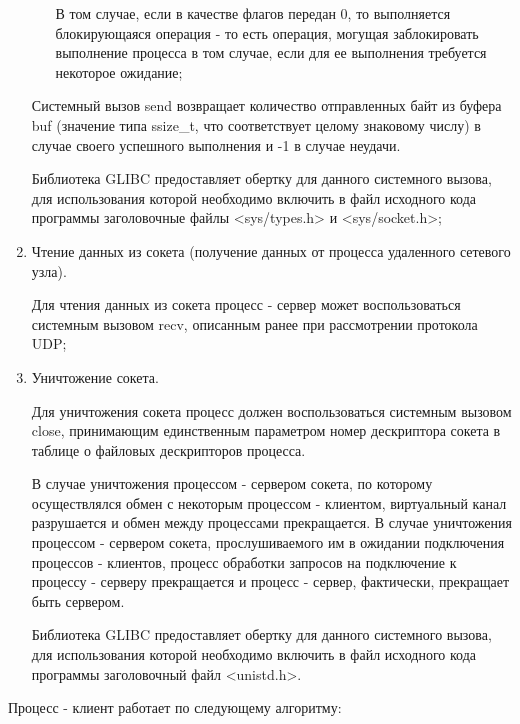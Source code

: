 \begin{enumerate}
\begin{enumerate}
					В том случае, если в качестве флагов передан 0, то выполняется блокирующаяся операция -
					то есть операция, могущая заблокировать выполнение процесса в том случае, если для ее выполнения требуется некоторое ожидание;
					
			\end{enumerate}

			Системный вызов send возвращает количество отправленных байт из буфера buf (значение типа ssize\_t, что соответствует целому знаковому числу)
			в случае своего успешного выполнения и -1 в случае неудачи.

			Библиотека GLIBC предоставляет обертку для данного системного вызова, для использования которой необходимо включить в файл исходного кода программы
			заголовочные файлы <sys/types.h> и <sys/socket.h>;

		\item Чтение данных из сокета (получение данных от процесса удаленного сетевого узла).

			Для чтения данных из сокета процесс - сервер может воспользоваться системным вызовом recv, описанным ранее при рассмотрении протокола UDP;

		\item Уничтожение сокета.

			Для уничтожения сокета процесс должен воспользоваться системным вызовом close, принимающим единственным параметром номер дескриптора
			сокета в таблице о файловых дескрипторов процесса.

			В случае уничтожения процессом - сервером сокета, по которому осуществлялся обмен с некоторым процессом - клиентом, виртуальный канал разрушается
			и обмен между процессами прекращается. В случае уничтожения процессом - сервером сокета, прослушиваемого им в ожидании подключения
			процессов - клиентов, процесс обработки запросов на подключение к процессу - серверу прекращается и процесс - сервер, фактически, прекращает
			быть сервером.
			
			Библиотека GLIBC предоставляет обертку для данного системного вызова, для использования которой необходимо включить в файл исходного кода программы
			заголовочный файл <unistd.h>.

	\end{enumerate}

	Процесс - клиент работает по следующему алгоритму:

